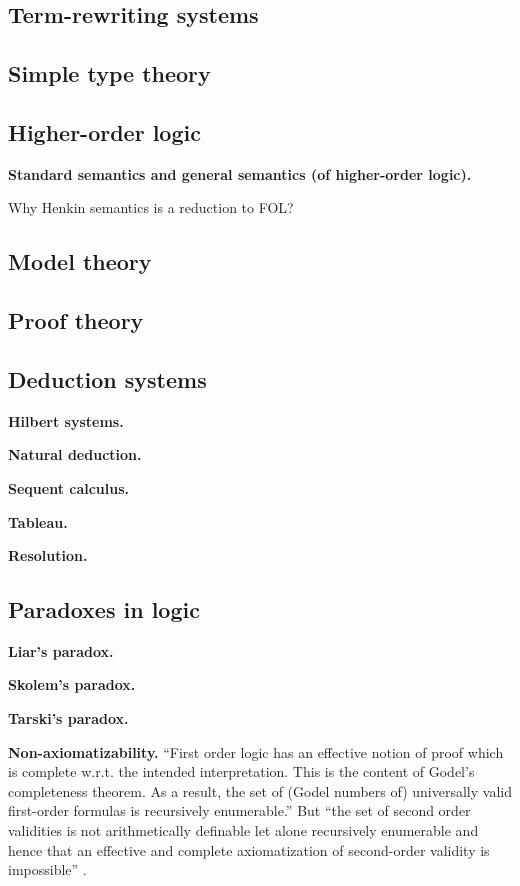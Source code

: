 \subsection{Term-rewriting systems}

\subsection{Simple type theory}

\subsection{Higher-order logic}

\textbf{Standard semantics and general semantics (of higher-order logic).}

Why Henkin semantics is a reduction to FOL?

\subsection{Model theory}

\subsection{Proof theory}

\subsection{Deduction systems}

\textbf{Hilbert systems.}

\textbf{Natural deduction.}

\textbf{Sequent calculus.}

\textbf{Tableau.}

\textbf{Resolution.}

\subsection{Paradoxes in logic}

\textbf{Liar's paradox.}

\textbf{Skolem's paradox.}

\textbf{Tarski's paradox.}

\textbf{Non-axiomatizability.}  ``First order logic has an effective notion of proof which is complete w.r.t. the intended interpretation.  This is the content of Godel's completeness theorem.  As a result, the set of (Godel numbers of) universally valid first-order formulas is recursively enumerable.''  But ``the set of second order validities is not arithmetically definable let alone recursively enumerable and hence that an effective and complete axiomatization of second-order validity is impossible'' \citep*{Benthem}.

